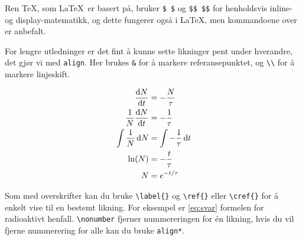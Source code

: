 Ren \TeX, som \LaTeX~er basert på, bruker \lstinline{$ $} og \lstinline{$$ $$} for henholdsvis
inline- og display-matematikk, og dette fungerer også i \LaTeX, men kommandoene over er anbefalt.

For lengre utledninger er det fint å kunne sette likninger pent under hverandre, det gjør vi
med \lstinline$align$. Her brukes \lstinline{&} for å markere referansepunktet, og \lstinline{\\}
for å markere linjeskift.

\begin{align}
	\dv{N}{t} &= -\frac{N}{\tau}  \label{eq:difflikning} \\
	\frac{1}{N}\dv{N}{t} &= -\frac{1}{\tau}  \nonumber \\
	\int \frac{1}{N} \dd{N} &= \int -\frac{1}{\tau} \dd{t} \\
	\ln(N) &= -\frac{t}{\tau}  \nonumber \\
	N &= e^{-t/\tau} \label{eq:svar}
\end{align}

Som med overskrifter kan du bruke \lstinline$\label{}$ og \lstinline$\ref{}$ eller 
\lstinline$\cref{}$ for å enkelt vise til en bestemt likning.
For eksempel er \cref{eq:svar} formelen for radioaktivt henfall.
\lstinline$\nonumber$ fjerner nummereringen for én likning, hvis du vil fjerne nummerering 
for alle kan du bruke \lstinline$align*$.




